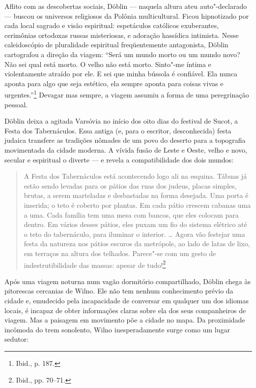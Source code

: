 Aflito com as descobertas sociais, Döblin --- naquela altura ateu
auto"-declarado --- buscou os universos religiosos da Polônia
multicultural. Ficou hipnotizado por cada local sagrado e visão
espiritual: espetáculos católicos exuberantes, cerimônias ortodoxas
russas misteriosas, e adoração hassídica intimista. Nesse caleidoscópio
de pluralidade espiritual freqüentemente antagonista, Döblin cartografou
a direção da viagem: ``Será um mundo morto ou um mundo novo? Não sei
qual está morto. O velho não está morto. Sinto"-me íntima e violentamente
atraído por ele. E sei que minha bússola é confiável. Ela nunca aponta
para algo que seja estético, ela sempre aponta para coisas vivas e
urgentes.''\footnote{Ibid., p. 187.} Devagar mas sempre, a viagem
assumiu a forma de uma peregrinação pessoal.

Döblin deixa a agitada Varsóvia no início dos oito dias do festival de
Sucot, a Festa dos Tabernáculos. Essa antiga (e, para o escritor,
desconhecida) festa judaica transfere as tradições nômades de um povo do
deserto para a topografia movimentada da cidade moderna. A vívida fusão
de Leste e Oeste, velho e novo, secular e espiritual o diverte --- e
revela a compatibilidade dos dois mundos:

\begin{quote}
A Festa dos Tabernáculos está acontecendo logo ali na esquina. Tábuas já
estão sendo levadas para os pátios das ruas dos judeus, placas simples,
brutas, a serem marteladas e desbastadas na forma desejada. Uma porta é
inserida; o teto é coberto por plantas. Em cada pátio crescem cabanas
uma a uma. Cada família tem uma mesa com bancos, que eles colocam para
dentro. Em vários desses pátios, eles puxam um fio do sistema elétrico
até o teto do tabernáculo, para iluminar o interior. \ldots{} Agora vão
festejar uma festa da natureza nos pátios escuros da metrópole, ao lado
de latas de lixo, em terraços na altura dos telhados. Parece"-se com um
gesto de indestrutibilidade das massas: apesar de tudo!\footnote{Ibid.,
  pp. 70--71.}
\end{quote}

Após uma viagem noturna num vagão dormitório compartilhado, Döblin chega
às pitorescas cercanias de Wilno. Ele não tem nenhum conhecimento prévio
da cidade e, emudecido pela incapacidade de conversar em qualquer um dos
idiomas locais, é incapaz de obter informações claras sobre ela dos seus
companheiros de viagem. Mas a paisagem em movimento põe a cidade no
mapa. Da proximidade incômoda do trem sonolento, Wilno inesperadamente
surge como um lugar sedutor:

